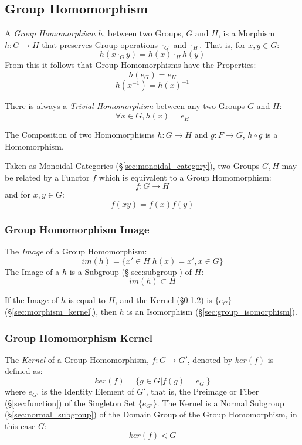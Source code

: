 \subsection{Group Homomorphism}\label{sec:group_homomorphism}

A \emph{Group Homomorphism} $h$, between two Groups, $G$ and $H$, is a
Morphism $h : G \rightarrow H$ that preserves Group operations
$\cdot_G$ and $\cdot_H$. That is, for $x,y \in G$:
\[
    h(x \cdot_G y) = h(x) \cdot_H h(y)
\]
From this it follows that Group Homomorphisms have the Properties:
\[
    h(e_G) = e_H
\]\[
    h(x^{-1}) = h(x)^{-1}
\]

There is always a \emph{Trivial Homomorphism} between any two Groups
$G$ and $H$:
\[
    \forall x \in G, h (x) = e_H
\]

The Composition of two Homomorphisms $h : G \rightarrow H$ and $g : F
\rightarrow G$, $h \circ g$ is a Homomorphism.

Taken as Monoidal Categories (\S\ref{sec:monoidal_category}), two
Groups $G, H$ may be related by a Functor $f$ which is equivalent to a
Group Homomorphism:
\[
    f : G \rightarrow H
\]
and for $x,y \in G$:
\[
    f(xy) = f(x)f(y)
\]



\subsubsection{Group Homomorphism Image}\label{sec:group_image}

The \emph{Image} of a Group Homomorphism:
\[
    im(h) = \{ x' \in H | h(x) = x', x \in G \}
\]
The Image of a $h$ is a Subgroup (\S\ref{sec:subgroup}) of $H$:
\[
    im(h) \subset H
\]

If the Image of $h$ is equal to $H$, and the Kernel
(\S\ref{sec:group_kernel}) is $\{e_G\}$ (\S\ref{sec:morphism_kernel}),
then $h$ is an Isomorphism (\S\ref{sec:group_isomorphism}).



\subsubsection{Group Homomorphism Kernel}\label{sec:group_kernel}

The \emph{Kernel} of a Group Homomorphism, $f : G \rightarrow G'$,
denoted by $ker(f)$ is defined as:
\[
    ker(f) = \{g \in G | f(g) = e_{G'}\}
\]
where $e_{G'}$ is the Identity Element of $G'$, that is, the Preimage
or Fiber (\S\ref{sec:function}) of the Singleton Set $\{e_{G'}\}$.
The Kernel is a Normal Subgroup (\S\ref{sec:normal_subgroup}) of the
Domain Group of the Group Homomorphism, in this case $G$:
\[
    ker(f) \triangleleft G
\]

